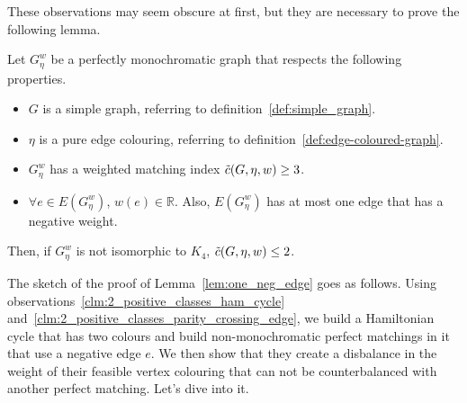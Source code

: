 These observations may seem obscure at first, but they are necessary to prove the following lemma.

\begin{lemma}
    \label{lem:one_neg_edge}
    Let $G_\eta^w$ be a perfectly monochromatic graph that respects the following properties.
    \begin{itemize}
        \item $G$ is a simple graph, referring to definition~\ref{def:simple_graph}.
        \item $\eta$ is a pure edge colouring, referring to definition~\ref{def:edge-coloured-graph}.
        \item $G_\eta^w$ has a weighted matching index $\Tilde{c}(G, \eta, w) \geq 3$.
        \item $\forall e \in E(G_\eta^w)$, $w(e) \in \mathbb{R}$.
        Also, $E(G_\eta^w)$ has at most one edge that has a negative weight.
    \end{itemize}
    Then, if $G_\eta^w$ is not isomorphic to $K_4$, $\Tilde{c}(G, \eta, w) \leq 2$.
\end{lemma}

The sketch of the proof of Lemma~\ref{lem:one_neg_edge} goes as follows.
Using observations~\ref{clm:2_positive_classes_ham_cycle} and~\ref{clm:2_positive_classes_parity_crossing_edge}, we build a Hamiltonian cycle that has two colours and build non-monochromatic perfect matchings in it that use a negative edge $e$.
We then show that they create a disbalance in the weight of their feasible vertex colouring that can not be counterbalanced with another perfect matching.
Let's dive into it.

